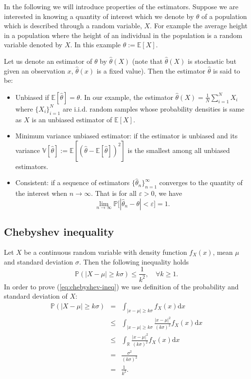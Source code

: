 \documentclass[11pt]{article}
\newcommand{\R}{\mathbb{R}}
\newcommand{\Ex}{\mathbb{E}}
\newcommand{\Var}{\mathbb{V}}
\newcommand{\Pro}{\mathbb{P}}
\newcommand{\dx}{\text{d}x}
\begin{document}
In the following we will introduce properties of the
estimators. Suppose we are interested in knowing a quantity of
interest which we denote by $\theta$ of a population which is
described through a random variable, $X$. For example the average
height in a population where the height of an individual in the
population is a random variable denoted by $X$. In this example $\theta
:= \Ex[X]$.

Let us denote an estimator of $\theta$ by $\hat{\theta}(X)$ (note that
$\hat{\theta}(X)$ is stochastic but given an observation $x$,
$\hat{\theta}(x)$ is a fixed value). Then the estimator $\hat{\theta}$
is said to be:
\begin{itemize}
\item Unbiased if $\Ex[\hat{\theta}] = \theta$. In our example, the
  estimator $\hat{\theta}(X) = \frac{1}{N}\sum_{i=1}^{N} X_i$ where
  $\{X_i\}_{i=1}^{N}$ are i.i.d. random samples whose probability
  densities is same as $X$ is an unbiased estimator of $\Ex[X]$.  
\item Minimum variance unbiased estimator: if the estimator is
  unbiased and its variance $\Var[\hat{\theta}] := \Ex[(\hat{\theta}
    - \Ex[\hat{\theta}])^2]$ is the smallest among all unbiased
  estimators.
  \item Consistent: if a sequence of estimators
    $\{\hat{\theta}_n\}_{n=1}^{\infty}$ converges to the quantity of
    the interest when $n \rightarrow \infty$. That is for all $\varepsilon
    >0$, we have
    \begin{equation}
      \lim_{n \rightarrow \infty} \Pro \big[ |\hat{\theta}_n - \theta| <
        \varepsilon \big] = 1.  
    \end{equation}
\end{itemize}
\subsection{Chebyshev inequality}
Let $X$ be a continuous random variable with density function
$f_X(x)$, mean $\mu$ and standard deviation $\sigma$. Then the
following inequality holds
\begin{equation} \label{eq:chebyshev-ineq}
  \Pro(|X-\mu| \geq k \sigma) \leq \frac{1}{k^2}, \quad \forall k \geq
  1.
\end{equation}
In order to prove (\ref{eq:chebyshev-ineq}) we use definition of the
probability and standard deviation of $X$:
\begin{equation}
  \begin{array}{rcl}
    \Pro(|X-\mu| \geq k \sigma) &=& \int_{|x-\mu|\geq k\sigma} f_X(x)
    \dx \\ &\leq& \int_{|x-\mu|\geq k\sigma}
    \frac{|x-\mu|^2}{(k\sigma)^2} f_X(x) \dx \\ &\leq& \int_{\R}
    \frac{|x-\mu|^2}{(k\sigma)^2} f_X(x) \dx \\ &=&
    \frac{\sigma^2}{(k\sigma)^2} \\ &=& \frac{1}{k^2}.
  \end{array}
\end{equation}
%
\end{document}
